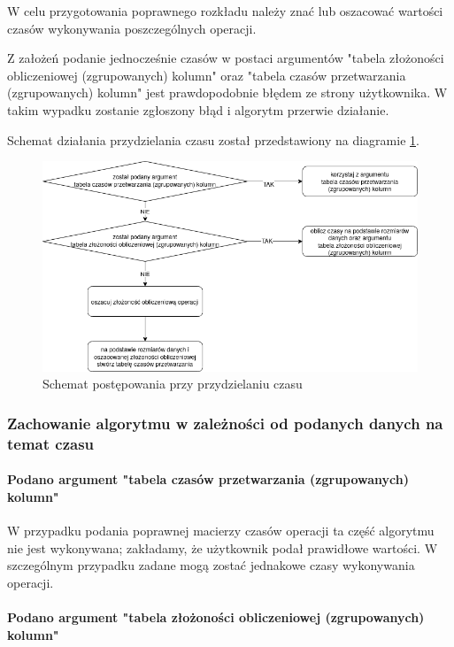 \documentclass[brudnopis]{xmgr}
\begin{document}
W celu przygotowania poprawnego rozkładu należy znać lub oszacować wartości czasów wykonywania poszczególnych operacji.

Z założeń podanie jednocześnie czasów w postaci argumentów "tabela złożoności obliczeniowej (zgrupowanych) kolumn" oraz "tabela czasów przetwarzania (zgrupowanych) kolumn" jest prawdopodobnie błędem ze strony użytkownika. W takim wypadku zostanie zgłoszony błąd i algorytm przerwie działanie.

Schemat działania przydzielania czasu został przedstawiony na diagramie \ref{diag:time-assign}.

\begin{figure}[!tbh]
\centering
\includegraphics[width=.8\hsize]{fig/przydzielanie_czasow.png}
\caption{Schemat postępowania przy przydzielaniu czasu\label{diag:time-assign}}
\end{figure}

\subsubsection{Zachowanie algorytmu w zależności od podanych danych na temat czasu}

\paragraph{Podano argument "tabela czasów przetwarzania (zgrupowanych) kolumn"}

W przypadku podania poprawnej macierzy czasów operacji ta część algorytmu nie jest wykonywana; zakładamy, że użytkownik podał prawidłowe wartości.
W szczególnym przypadku zadane mogą zostać jednakowe czasy wykonywania operacji.

\paragraph{Podano argument "tabela złożoności obliczeniowej (zgrupowanych) kolumn"}
\end{document}
